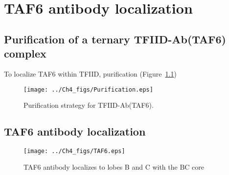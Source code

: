 
\chapter{TAF6 antibody localization}

\section{Purification of a ternary TFIID-Ab(TAF6) complex}

To localize TAF6 within TFIID, purification (Figure~\ref{fig:Purify})

\begin{figure}
\centering
\texttt{[image: ../Ch4\_figs/Purification.eps]}
\caption[Purification strategy for TFIID-Ab(TAF6)]{Purification strategy for TFIID-Ab(TAF6).}
\label{fig:Purify}
\end{figure}

\section{TAF6 antibody localization}

\begin{figure}
\centering
\texttt{[image: ../Ch4\_figs/TAF6.eps]}
\caption[TAF6 antibody localizes to lobes B and C with the BC core]{TAF6 antibody localizes to lobes B and C with the BC core}
\label{fig:TAF6}
\end{figure}


